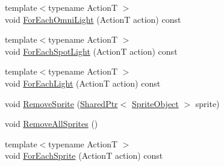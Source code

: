 \begin{DoxyCompactItemize}
{\footnotesize template$<$typename ActionT $>$ }\\void \hyperlink{classmage_1_1_world_acd29a1806e15e3a8f923d3acbb90ac01}{For\+Each\+Omni\+Light} (ActionT action) const
\item 
{\footnotesize template$<$typename ActionT $>$ }\\void \hyperlink{classmage_1_1_world_ae82360b5ba2aa2fe947670f882607c9b}{For\+Each\+Spot\+Light} (ActionT action) const
\item 
{\footnotesize template$<$typename ActionT $>$ }\\void \hyperlink{classmage_1_1_world_a7f6e04d24be88ae3126021d1b935ef72}{For\+Each\+Light} (ActionT action) const
\item 
void \hyperlink{classmage_1_1_world_a78bb790257c3a03ccb6829859230b4c7}{Remove\+Sprite} (\hyperlink{namespacemage_a1e01ae66713838a7a67d30e44c67703e}{Shared\+Ptr}$<$ \hyperlink{classmage_1_1_sprite_object}{Sprite\+Object} $>$ sprite)
\item 
void \hyperlink{classmage_1_1_world_a47f677ad48d834b89ff29c9c1a82dd9f}{Remove\+All\+Sprites} ()
\item 
{\footnotesize template$<$typename ActionT $>$ }\\void \hyperlink{classmage_1_1_world_aa81817e1ebc34170d255e2efef1f3134}{For\+Each\+Sprite} (ActionT action) const
\end{DoxyCompactItemize}
